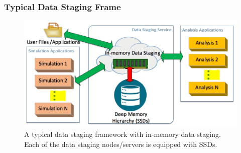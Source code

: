\documentclass{beamer}
\begin{document}
\begin{frame}
\frametitle{Typical Data Staging Frame}
\begin{figure}
        \includegraphics[width=\textwidth]{images/stacker_fig_1.jpg}
        \caption{A typical data staging framework with in-memory data staging. Each of the data staging nodes/servers is equipped with SSDs.}
\end{figure}
\end{frame} 
\end{document}
